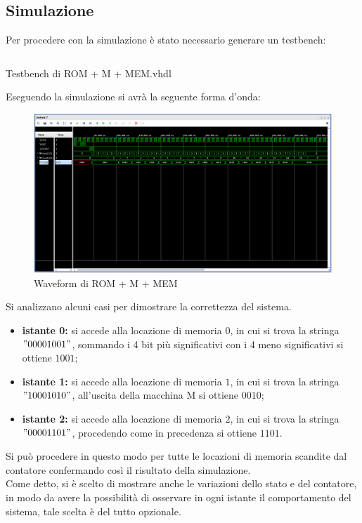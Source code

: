 \subsection{Simulazione}
Per procedere con la simulazione è stato necessario generare un testbench:
\begin{code}
    \inputminted[frame=lines, framesep=2mm, baselinestretch=1.2, bgcolor=LightGray, fontsize=\footnotesize, linenos]{vhdl}{vhdl_files/ROM_MEM_M/Rom_M_MEM_tb.vhd}
    \caption{Testbench di ROM + M + MEM.vhdl}
    \label{lbl:ROMC}
\end{code}
Eseguendo la simulazione si avrà la seguente forma d'onda:
\begin{figure}[H]
	\centering
	\includegraphics[width=1\textwidth]{img/ROM_M_MEM_waweform.PNG}
	\caption{Waveform di ROM + M + MEM}
	\label{schemROM_M_MEM} 
\end{figure}
Si analizzano alcuni casi per dimostrare la correttezza del sistema.
\begin{itemize}
    \item \textbf{istante 0:} si accede alla locazione di memoria $0$, in cui si trova la stringa $"00001001"$, sommando i 4 bit più significativi con i 4 meno significativi si ottiene $1001$;
    \item \textbf{istante 1:} si accede alla locazione di memoria $1$, in cui si trova la stringa $"10001010"$, all'uscita della macchina M si ottiene $0010$;
   \item \textbf{istante 2:} si accede alla locazione di memoria $2$, in cui si trova la stringa $"00001101"$, procedendo come in precedenza si ottiene $1101$.
\end{itemize}
Si può procedere in questo modo per tutte le locazioni di memoria scandite dal contatore confermando così il risultato della simulazione.\\
Come detto, si è scelto di mostrare anche le variazioni dello stato e del contatore, in modo da avere la possibilità di osservare in ogni istante il comportamento del sistema, tale scelta è del tutto opzionale.
